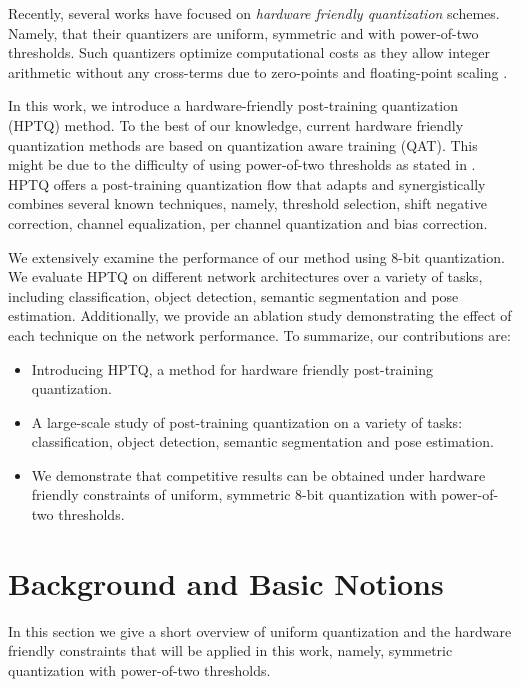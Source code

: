 \documentclass{article}
\begin{document}
Recently, several works \cite{jain2019trained,hmq,uhlich2019mixed} have focused on \textit{hardware friendly quantization} schemes.
Namely, that their quantizers are uniform, symmetric and with power-of-two thresholds. 
Such quantizers optimize computational costs as they allow integer arithmetic without any cross-terms due to zero-points and floating-point scaling \cite{jain2019trained}.




In this work, we introduce a hardware-friendly post-training quantization (HPTQ) method.
To the best of our knowledge, current hardware friendly quantization methods are based on quantization aware training (QAT). 
This might be due to the difficulty of using power-of-two thresholds as stated in \cite{nagel2021white}. 
HPTQ offers a post-training quantization flow that adapts and synergistically combines several known techniques, namely, threshold selection, shift negative correction, channel equalization, per channel quantization and bias correction. 

We extensively examine the performance of our method using 8-bit quantization. 
We evaluate HPTQ on different network architectures over a variety of tasks, including classification, object detection, semantic segmentation and pose estimation. Additionally, we provide an ablation study demonstrating the effect of each technique on the network performance.
To summarize, our contributions are:
\begin{itemize}
    \item Introducing HPTQ, a method for hardware friendly post-training quantization.
    \item A large-scale study of post-training quantization on a variety of tasks: classification, object detection, semantic segmentation and pose estimation.
    \item We demonstrate that competitive results can be obtained under hardware friendly constraints of uniform, symmetric 8-bit quantization with power-of-two thresholds.
\end{itemize}





 \section{Background and Basic Notions}
\label{sec:background}

In this section we give a short overview of uniform quantization and the hardware friendly constraints that will be applied in this work, namely, symmetric quantization with power-of-two thresholds.
\end{document}
